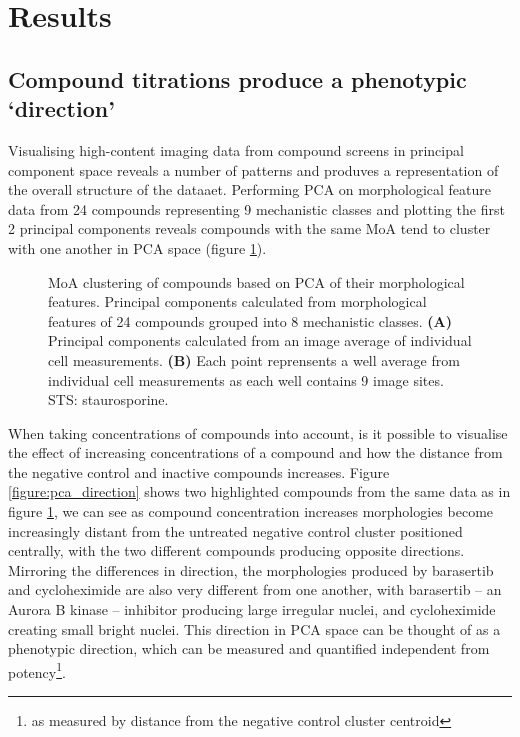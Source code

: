 \documentclass[a4paper,11pt,twoside,openright]{scrbook}
\begin{document}




\section{Results}

\subsection{Compound titrations produce a phenotypic `direction'}
 
Visualising high-content imaging data from compound screens in principal component space reveals a number of patterns and produves a representation of the overall structure of the dataaet.
Performing PCA on morphological feature data from 24 compounds representing 9 mechanistic classes and plotting the first 2 principal components reveals compounds with the same MoA tend to cluster with one another in PCA space (figure \ref{figure:pca_clustering}).

\begin{figure}
    \captionsetup{width=0.8\textwidth}
    \caption[PCA compound clustering based on MoA]{
MoA clustering of compounds based on PCA of their morphological features. 
Principal components calculated from morphological features of 24 compounds grouped into 8 mechanistic classes.
\textbf{(A)} Principal components calculated from an image average of individual cell measurements.
\textbf{(B)} Each point reprensents a well average from individual cell measurements as each well contains 9 image sites.
STS: staurosporine.
}
    
    \label{figure:pca_clustering}
\end{figure}

When taking concentrations of compounds into account, is it possible to visualise the effect of increasing concentrations of a compound and how the distance from the negative control and inactive compounds increases.
Figure \ref{figure:pca_direction} shows two highlighted compounds from the same data as in figure \ref{figure:pca_clustering}, we can see as compound concentration increases morphologies become increasingly distant from the untreated negative control cluster positioned centrally, with the two different compounds producing opposite directions.
Mirroring the differences in direction, the morphologies produced by barasertib and cycloheximide are also very different from one another, with barasertib -- an Aurora B kinase -- inhibitor producing large irregular nuclei, and cycloheximide creating small bright nuclei.
This direction in PCA space can be thought of as a phenotypic direction, which can be measured and quantified independent from potency\footnote{as measured by distance from the negative control cluster centroid}.
\end{document}
